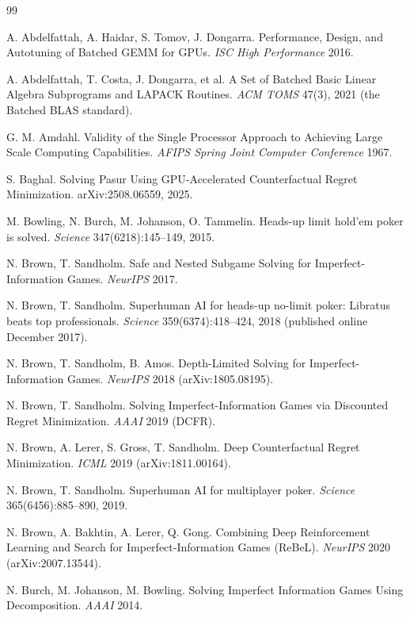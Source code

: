 \documentclass[11pt]{article}
\begin{document}
\begin{thebibliography}{99}

 A. Abdelfattah, A. Haidar, S. Tomov, J. Dongarra. Performance,
Design, and Autotuning of Batched GEMM for GPUs. \emph{ISC High Performance} 2016.

 A. Abdelfattah, T. Costa, J. Dongarra, et al. A Set of Batched
Basic Linear Algebra Subprograms and LAPACK Routines. \emph{ACM TOMS} 47(3), 2021 (the
Batched BLAS standard).

 G. M. Amdahl. Validity of the Single Processor Approach to
Achieving Large Scale Computing Capabilities. \emph{AFIPS Spring Joint Computer
Conference} 1967.

 S. Baghal. Solving Pasur Using GPU-Accelerated Counterfactual
Regret Minimization. arXiv:2508.06559, 2025.

 M. Bowling, N. Burch, M. Johanson, O. Tammelin. Heads-up limit
hold'em poker is solved. \emph{Science} 347(6218):145--149, 2015.

 N. Brown, T. Sandholm. Safe and Nested Subgame Solving for
Imperfect-Information Games. \emph{NeurIPS} 2017.

 N. Brown, T. Sandholm. Superhuman AI for heads-up
no-limit poker: Libratus beats top professionals. \emph{Science} 359(6374):418--424,
2018 (published online December 2017).

 N. Brown, T. Sandholm, B. Amos. Depth-Limited Solving for
Imperfect-Information Games. \emph{NeurIPS} 2018 (arXiv:1805.08195).

 N. Brown, T. Sandholm. Solving Imperfect-Information Games
via Discounted Regret Minimization. \emph{AAAI} 2019 (DCFR).

 N. Brown, A. Lerer, S. Gross, T. Sandholm. Deep
Counterfactual Regret Minimization. \emph{ICML} 2019 (arXiv:1811.00164).

 N. Brown, T. Sandholm. Superhuman AI for multiplayer
poker. \emph{Science} 365(6456):885--890, 2019.

 N. Brown, A. Bakhtin, A. Lerer, Q. Gong. Combining Deep
Reinforcement Learning and Search for Imperfect-Information Games (ReBeL). \emph{NeurIPS}
2020 (arXiv:2007.13544).

 N. Burch, M. Johanson, M. Bowling. Solving Imperfect Information
Games Using Decomposition. \emph{AAAI} 2014.


\end{thebibliography}
\end{document}
